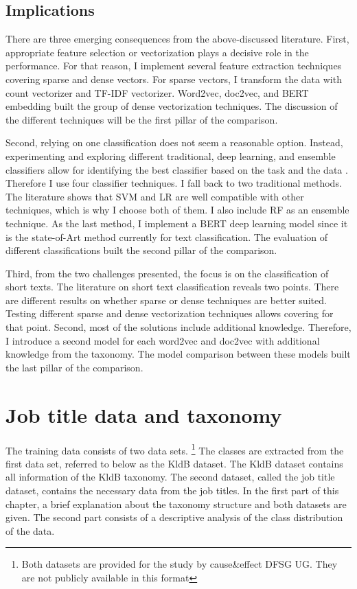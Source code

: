 \documentclass[12pt, a4paper, titlepage]{article}
\begin{document}
\subsection*{Implications}
There are three emerging consequences from the above-discussed literature. First, appropriate feature selection or vectorization plays a decisive role in the performance. For that reason, I implement several feature extraction techniques covering sparse and dense vectors. For sparse vectors, I transform the data with count vectorizer and \ac{TF-IDF} vectorizer. Word2vec, doc2vec, and \ac{BERT} embedding built the group of dense vectorization techniques. The discussion of the different techniques will be the first pillar of the comparison. 

Second, relying on one classification does not seem a reasonable option. Instead, experimenting and exploring different traditional, deep learning, and ensemble classifiers allow for identifying the best classifier based on the task and the data \citep{maglogiannis2007}. Therefore I use four classifier techniques. I fall back to two traditional methods. The literature shows that \ac{SVM} and \ac{LR} are well compatible with other techniques, which is why I choose both of them. I also include \ac{RF} as an ensemble technique. As the last method, I implement a \ac{BERT} deep learning model since it is the state-of-Art method currently for text classification. The evaluation of different classifications built the second pillar of the comparison. 

Third, from the two challenges presented, the focus is on the classification of short texts. The literature on short text classification reveals two points. There are different results on whether sparse or dense techniques are better suited. Testing different sparse and dense vectorization techniques allows covering for that point. Second, most of the solutions include additional knowledge. Therefore, I introduce a second model for each word2vec and doc2vec with additional knowledge from the taxonomy. The model comparison between these models built the last pillar of the comparison. 


\section{Job title data and taxonomy}
The training data consists of two data sets. \footnote{Both datasets are provided for the study by cause\&effect DFSG UG. They are not publicly available in this format} The classes are extracted from the first data set, referred to below as the \ac{KldB} dataset. The \ac{KldB} dataset contains all information of the \ac{KldB} taxonomy. The second dataset, called the job title dataset, contains the necessary data from the job titles. In the first part of this chapter, a brief explanation about the taxonomy structure and both datasets are given. The second part consists of a descriptive analysis of the class distribution of the data. 
\end{document}
